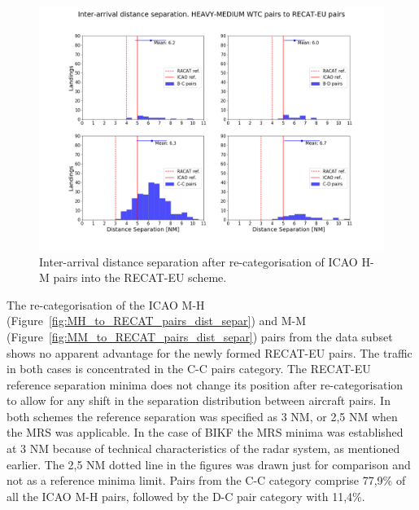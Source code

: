 \begin{figure}[h]
    \centering
    \includegraphics[width=1\textwidth]{graphics/fig_HM_to_RECAT_pairs_dist_separ.png}
    \caption[Inter-arrival distance separation of ICAO H-M pairs into the RECAT-EU scheme]{Inter-arrival distance separation after re-categorisation of ICAO H-M pairs into the RECAT-EU scheme.}
    \label{fig:HM_to_RECAT_pairs_dist_separ}
\end{figure}

The re-categorisation of  the ICAO M-H (Figure~\ref{fig:MH_to_RECAT_pairs_dist_separ}) and M-M (Figure~\ref{fig:MM_to_RECAT_pairs_dist_separ}) pairs from the data subset shows no apparent advantage for the newly formed RECAT-EU pairs. The traffic in both cases is concentrated in the C-C pairs category. The RECAT-EU reference separation minima does not change its position after re-categorisation to allow for any shift in the separation distribution between aircraft pairs. In both schemes the reference separation was specified as 3 NM, or 2,5 NM when the MRS was applicable. In the case of BIKF the MRS minima was established at 3 NM because of technical characteristics of the radar system, as mentioned earlier. The 2,5 NM dotted line in the figures was drawn just for comparison and not as a reference minima limit.  Pairs from the C-C category comprise 77,9\% of all the ICAO M-H pairs, followed by the D-C pair category with 11,4\%.

